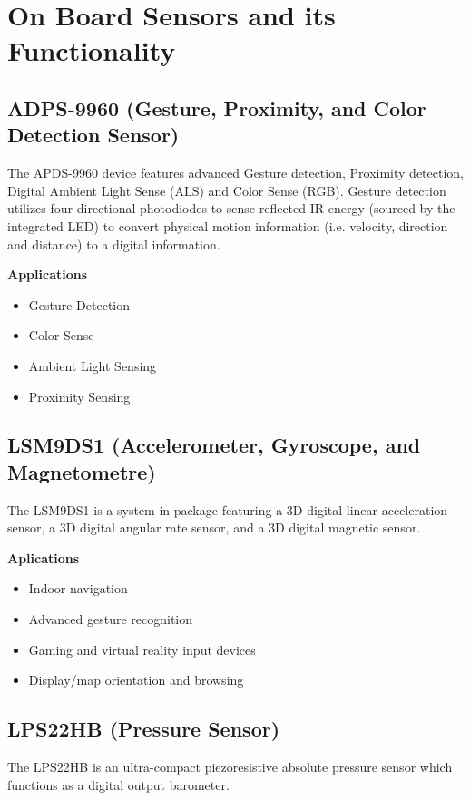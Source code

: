 \section{On Board Sensors and its Functionality}

\subsection{ADPS-9960 (Gesture, Proximity, and Color Detection Sensor)}

The APDS-9960 device features advanced Gesture detection, Proximity detection, Digital Ambient Light Sense (ALS) and Color Sense (RGB). \cite{ArduinoNano33:2021} Gesture detection utilizes four directional photodiodes to sense reflected IR energy (sourced by the integrated LED) to convert physical motion information (i.e. velocity, direction and distance) to a digital information.



\textbf{Applications}

\begin{itemize}
  \item Gesture Detection
  \item Color Sense
  \item Ambient Light Sensing
  \item Proximity Sensing
\end{itemize}

\subsection{LSM9DS1 (Accelerometer, Gyroscope, and Magnetometre)}
The LSM9DS1 is a system-in-package featuring a 3D digital linear acceleration sensor, a 3D digital angular rate sensor, and a 3D digital magnetic sensor.

\textbf{Aplications}

\begin{itemize}
  \item Indoor navigation
  \item Advanced gesture recognition
  \item Gaming and virtual reality input devices
  \item Display/map orientation and browsing
\end{itemize}
  
\subsection{LPS22HB (Pressure Sensor)}
The LPS22HB is an ultra-compact piezoresistive absolute pressure sensor which functions as a
digital output barometer.

